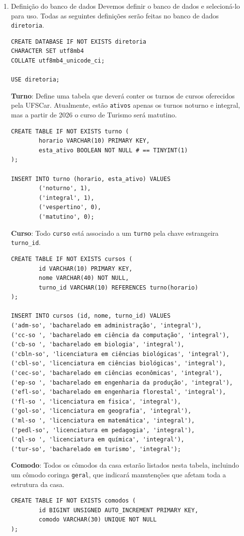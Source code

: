 \documentclass[11pt]{article}
\begin{document}
\begin{enumerate}
\begin{center}
\end{center}
\begin{enumerate}
\item Definição do banco de dados
Devemos definir o banco de dados e selecioná-lo para uso. Todas as seguintes definições serão feitas no banco de dados \texttt{diretoria}.
\begin{verbatim}
CREATE DATABASE IF NOT EXISTS diretoria
CHARACTER SET utf8mb4
COLLATE utf8mb4_unicode_ci;

USE diretoria;
\end{verbatim}
\textbf{Turno}:
Define uma tabela que deverá conter os turnos de cursos oferecidos pela UFSCar. Atualmente, estão \texttt{ativos} apenas os turnos noturno e integral, mas a partir de 2026 o curso de Turismo será matutino.
\begin{verbatim}
CREATE TABLE IF NOT EXISTS turno (
        horario VARCHAR(10) PRIMARY KEY,
        esta_ativo BOOLEAN NOT NULL # == TINYINT(1)
);

INSERT INTO turno (horario, esta_ativo) VALUES
        ('noturno', 1),
        ('integral', 1),
        ('vespertino', 0),
        ('matutino', 0);

\end{verbatim}
\textbf{Curso}:
Todo \texttt{curso} está associado a um \texttt{turno} pela chave estrangeira \texttt{turno\_id}. 

\begin{verbatim}
CREATE TABLE IF NOT EXISTS cursos (
        id VARCHAR(10) PRIMARY KEY,
        nome VARCHAR(40) NOT NULL,
        turno_id VARCHAR(10) REFERENCES turno(horario)
);

INSERT INTO cursos (id, nome, turno_id) VALUES
('adm-so', 'bacharelado em administração', 'integral'),
('cc-so ', 'bacharelado em ciência da computação', 'integral'),
('cb-so ', 'bacharelado em biologia', 'integral'),
('cbln-so', 'licenciatura em ciências biológicas', 'integral'),
('cbl-so', 'licenciatura em ciências biológicas', 'integral'),
('cec-so', 'bacharelado em ciências econômicas', 'integral'),
('ep-so ', 'bacharelado em engenharia da produção', 'integral'),
('efl-so', 'bacharelado em engenharia florestal', 'integral'),
('fl-so ', 'licenciatura em fisica', 'integral'),
('gol-so', 'licenciatura em geografia', 'integral'),
('ml-so ', 'licenciatura em matemática', 'integral'),
('pedl-so', 'licenciatura em pedagogia', 'integral'),
('ql-so ', 'licenciatura em química', 'integral'),
('tur-so', 'bacharelado em turismo', 'integral');
\end{verbatim}
\textbf{Comodo}:
Todos os cômodos da casa estarão listados nesta tabela, incluindo um cômodo coringa \texttt{geral}, que indicará manutenções que afetam toda a estrutura da casa. 
\begin{verbatim}
CREATE TABLE IF NOT EXISTS comodos (
        id BIGINT UNSIGNED AUTO_INCREMENT PRIMARY KEY,
        comodo VARCHAR(30) UNIQUE NOT NULL
);  


\end{verbatim}
\end{enumerate}
\end{enumerate}
\end{document}
